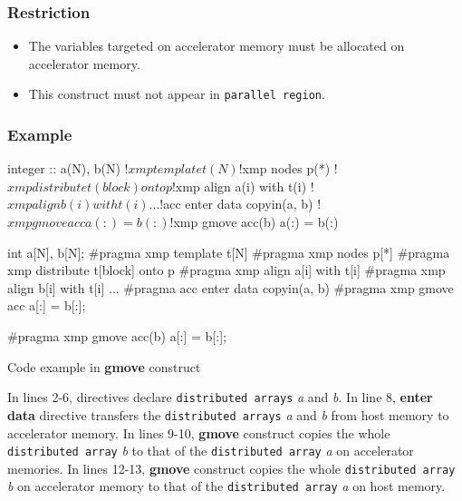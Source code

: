\subsubsection*{Restriction}
\begin{itemize}
 \item The variables targeted on accelerator memory must be allocated on accelerator memory.
 \item This construct must not appear in {\OACC} {\tt parallel region}.
\end{itemize}

\subsubsection*{Example}
\begin{myfigure}
\begin{minipage}{0.45\hsize}
\begin{center}
\begin{XACCFexampleL}
integer :: a(N), b(N)
!$xmp template t(N)
!$xmp nodes p(*)
!$xmp distribute t(block) onto p
!$xmp align a(i) with t(i)
!$xmp align b(i) with t(i)
...
!$acc enter data copyin(a, b)
!$xmp gmove acc
  a(:) = b(:)

!$xmp gmove acc(b)
  a(:) = b(:)
\end{XACCFexampleL}
\end{center}
\end{minipage}
%
\begin{minipage}{0.53\hsize}
\begin{center}
\begin{XACCCexampleR}
int a[N], b[N];
#pragma xmp template t[N]
#pragma xmp nodes p[*]
#pragma xmp distribute t[block] onto p
#pragma xmp align a[i] with t[i]
#pragma xmp align b[i] with t[i]
...
#pragma acc enter data copyin(a, b)
#pragma xmp gmove acc
  a[:] = b[:];

#pragma xmp gmove acc(b)
  a[:] = b[:];
\end{XACCCexampleR}
\end{center}
\end{minipage}
\caption{Code example in {\XACC} {\bf gmove} construct}\label{code:gmove}
\end{myfigure}

In lines 2-6,
{\XMP} directives declare {\tt distributed arrays} {\it a} and {\it b}.
In line 8,
{\OACC} {\bf enter data} directive transfers the {\tt distributed arrays} {\it a} and {\it b} from host memory to accelerator memory.
In lines 9-10,
{\XACC} {\bf gmove} construct copies the whole {\tt distributed array} {\it b} to
that of the {\tt distributed array} {\it a} on accelerator memories.
In lines 12-13,
{\XACC} {\bf gmove} construct copies the whole {\tt distributed array} {\it b} on accelerator memory to
that of the {\tt distributed array} {\it a} on host memory.

